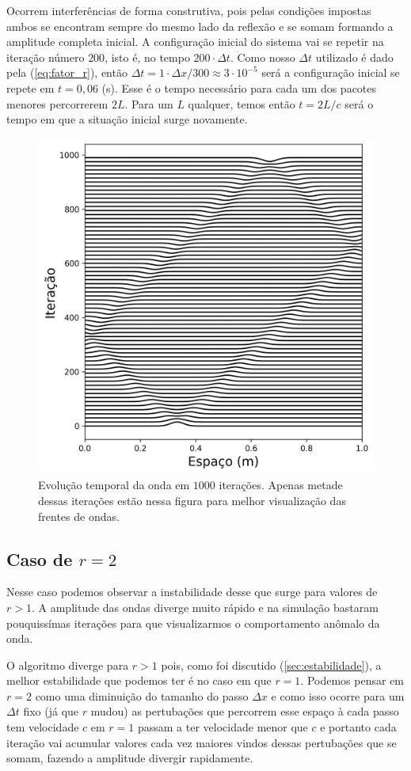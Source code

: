 \documentclass[a4paper, 11pt]{tufte-handout}
\begin{document}
Ocorrem interferências de forma construtiva, pois pelas condições impostas ambos se encontram sempre
do mesmo lado da reflexão e se somam formando a amplitude completa inicial.
A configuração inicial do sistema vai se repetir na iteração número $200$, isto é, no tempo
\( 200 \cdot \Delta t \). Como nosso \( \Delta t\) utilizado é dado pela (\ref{eq:fator_r}), então \( \Delta t = 1 \cdot
\Delta x / 300  \approx 3 \cdot 10^{-5} \) será a configuração inicial se repete em \( t = 0,06 \) (s). Esse
é o tempo necessário para cada um dos pacotes menores percorrerem \( 2 L\). Para um \( L \)
qualquer, temos então \( t = 2 L / c \) será o tempo em que a situação inicial surge novamente.


\begin{figure}[h!] 
    \centering
    \centering
    \includegraphics[width=0.5\linewidth]{graf-tarefa1-a}
    \caption{Evolução temporal da onda em $1000$ iterações. Apenas metade dessas iterações  estão nessa figura para melhor visualização das frentes de ondas.}
    \label{fig:tarefa1-a}
\end{figure}


\subsection{Caso de \( r = 2 \) }
\label{sec:caso_r_2}

Nesse caso podemos observar a instabilidade desse que surge para valores de \( r > 1  \).
A amplitude das ondas diverge muito rápido e na simulação bastaram pouquissímas iterações
para que visualizarmos o comportamento anômalo  da onda.

O algoritmo diverge para \( r > 1 \) pois, como foi discutido (\ref{sec:estabilidade}), a melhor
estabilidade que podemos ter é no caso em que \( r = 1 \). Podemos pensar em \( r = 2 \) como uma
diminuição do tamanho do passo \( \Delta x\) e como isso ocorre para um \( \Delta t \) fixo (já que $r$ mudou)
as pertubações que percorrem esse espaço à cada passo tem velocidade \( c \) em \( r = 1 \) passam a
ter velocidade menor que \( c \) e portanto cada iteração vai acumular valores cada vez maiores
vindos dessas pertubações que se somam, fazendo a amplitude divergir rapidamente.
\end{document}
